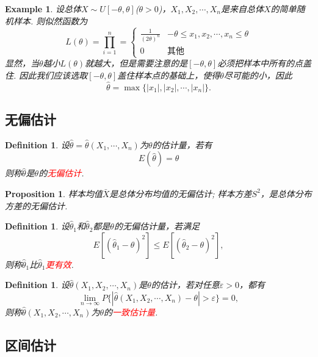 \documentclass{article}
\newtheorem{proposition}[theorem]{Proposition}
\newtheorem{example}[theorem]{Example}
\newtheorem{definition}[theorem]{Definition}
\newcommand{\redt}[1]{\textcolor{red}{#1}}
\begin{document}
\begin{example}
\rm 设总体$X \sim U[-\theta,\theta]$($\theta >0$)，$X_1,X_2,\cdots,X_n$是来自总体$X$的简单随机样本. 则似然函数为
$$
L(\theta) = \prod_{i=1}^{n} = \left\{ \begin{array}{ll}
\frac{1}{(2\theta)^n} & -\theta \leq x_1,x_2,\cdots,x_n \leq \theta \\
0 & \text{其他}
\end{array} \right.
$$
显然，当$\theta$越小$L(\theta)$就越大，但是需要注意的是$[-\theta,\theta]$必须把样本中所有的点盖住. 因此我们应该选取$[-\theta,\theta]$盖住样本点的基础上，使得$\theta$尽可能的小，因此
$$
\widehat{\theta} = \max\{|x_1|,|x_2|,\cdots,|x_n|\}. 
$$
\end{example}

\subsection{无偏估计}

\begin{definition}
\rm 设$\widehat{\theta} = \widehat{\theta}(X_1,\cdots,X_n)$为$\theta$的估计量，若有
$$
E(\widehat{\theta}) = \theta
$$
则称$\widehat{\theta}$是$\theta$的\redt{无偏估计}.
\end{definition}


\begin{proposition}
\rm 样本均值$\bar{X}$是总体分布均值的无偏估计; 样本方差$S^2$，是总体分布方差的无偏估计.
\end{proposition}

\begin{definition}
\rm 设$\widehat{\theta}_1$和$\widehat{\theta}_2$都是$\theta$的无偏估计量，若满足
$$
E[(\widehat{\theta}_1-\theta)^2] \leq E[(\widehat{\theta}_2-\theta)^2],
$$
则称$\widehat{\theta}_1$比$\widehat{\theta}_1$\redt{更有效}. 
\end{definition}

\begin{definition}
\rm 设$\widehat{\theta}(X_1,X_2,\cdots,X_n)$是$\theta$的估计，若对任意$\varepsilon > 0$，都有
$$
\lim\limits_{n \to \infty} P\{|\widehat{\theta}(X_1,X_2,\cdots,X_n)-\theta| > \varepsilon \} = 0,
$$
则称$\widehat{\theta}(X_1,X_2,\cdots,X_n)$为$\theta$的\redt{一致估计量}. 
\end{definition}

\subsection{区间估计}
\end{document}
